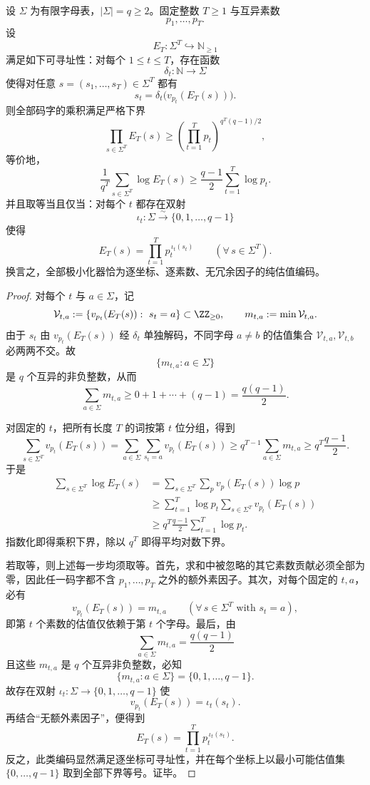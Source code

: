 \begin{theorem}\label{thm:xi-addressable-godel-product-lower-bound-classification}
设 \(\Sigma\) 为有限字母表，\(|\Sigma|=q\ge 2\)。固定整数 \(T\ge 1\) 与互异素数
\[
p_1,\dots,p_T.
\]
设
\[
E_T:\Sigma^T\hookrightarrow \mathbb N_{\ge 1}
\]
满足如下可寻址性：对每个 \(1\le t\le T\)，存在函数
\[
\delta_t:\mathbb N\to \Sigma
\]
使得对任意 \(s=(s_1,\dots,s_T)\in\Sigma^T\) 都有
\[
s_t=\delta_t\!\bigl(v_{p_t}(E_T(s))\bigr).
\]
则全部码字的乘积满足严格下界
\[
\prod_{s\in\Sigma^T}E_T(s)
\ge
\left(\prod_{t=1}^{T}p_t\right)^{q^T(q-1)/2},
\]
等价地，
\[
\frac{1}{q^T}\sum_{s\in\Sigma^T}\log E_T(s)
\ge
\frac{q-1}{2}\sum_{t=1}^{T}\log p_t.
\]
并且取等当且仅当：对每个 \(t\) 都存在双射
\[
\iota_t:\Sigma\xrightarrow{\sim}\{0,1,\dots,q-1\}
\]
使得
\[
E_T(s)=\prod_{t=1}^{T}p_t^{\,\iota_t(s_t)}
\qquad
(\forall\,s\in\Sigma^T).
\]
换言之，全部极小化器恰为逐坐标、逐素数、无冗余因子的纯估值编码。
\end{theorem}
\begin{proof}
对每个 \(t\) 与 \(a\in\Sigma\)，记
\[
\mathcal V_{t,a}:=
\{v_{p_t}(E_T(s)):\ s_t=a\}\subset \ZZ_{\ge 0},
\qquad
m_{t,a}:=\min \mathcal V_{t,a}.
\]
由于 \(s_t\) 由 \(v_{p_t}(E_T(s))\) 经 \(\delta_t\) 单独解码，不同字母 \(a\neq b\) 的估值集合 \(\mathcal V_{t,a},\mathcal V_{t,b}\) 必两两不交。故
\[
\{m_{t,a}:a\in\Sigma\}
\]
是 \(q\) 个互异的非负整数，从而
\[
\sum_{a\in\Sigma}m_{t,a}\ge 0+1+\cdots+(q-1)=\frac{q(q-1)}{2}.
\]

对固定的 \(t\)，把所有长度 \(T\) 的词按第 \(t\) 位分组，得到
\[
\sum_{s\in\Sigma^T}v_{p_t}(E_T(s))
=
\sum_{a\in\Sigma}\sum_{s_t=a}v_{p_t}(E_T(s))
\ge
q^{T-1}\sum_{a\in\Sigma}m_{t,a}
\ge
q^T\frac{q-1}{2}.
\]
于是
\[
\begin{aligned}
\sum_{s\in\Sigma^T}\log E_T(s)
&=
\sum_{s\in\Sigma^T}\sum_{p}v_p(E_T(s))\log p\\
&\ge
\sum_{t=1}^{T}\log p_t\sum_{s\in\Sigma^T}v_{p_t}(E_T(s))\\
&\ge
q^T\frac{q-1}{2}\sum_{t=1}^{T}\log p_t.
\end{aligned}
\]
指数化即得乘积下界，除以 \(q^T\) 即得平均对数下界。

若取等，则上述每一步均须取等。首先，求和中被忽略的其它素数贡献必须全部为零，因此任一码字都不含 \(p_1,\dots,p_T\) 之外的额外素因子。其次，对每个固定的 \(t,a\)，必有
\[
v_{p_t}(E_T(s))=m_{t,a}
\qquad
(\forall\,s\in\Sigma^T\text{ with }s_t=a),
\]
即第 \(t\) 个素数的估值仅依赖于第 \(t\) 个字母。最后，由
\[
\sum_{a\in\Sigma}m_{t,a}=\frac{q(q-1)}{2}
\]
且这些 \(m_{t,a}\) 是 \(q\) 个互异非负整数，必知
\[
\{m_{t,a}:a\in\Sigma\}=\{0,1,\dots,q-1\}.
\]
故存在双射 \(\iota_t:\Sigma\to\{0,1,\dots,q-1\}\) 使
\[
v_{p_t}(E_T(s))=\iota_t(s_t).
\]
再结合“无额外素因子”，便得到
\[
E_T(s)=\prod_{t=1}^{T}p_t^{\,\iota_t(s_t)}.
\]
反之，此类编码显然满足逐坐标可寻址性，并在每个坐标上以最小可能估值集 \(\{0,\dots,q-1\}\) 取到全部下界等号。证毕。
\end{proof}


